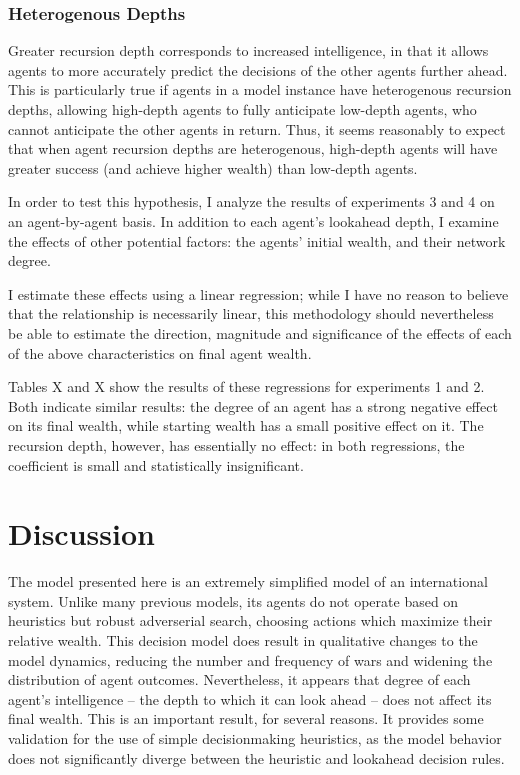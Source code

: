 \documentclass{article}
\begin{document}
\subsubsection{Heterogenous Depths}

Greater recursion depth corresponds to increased intelligence, in that it allows agents to more accurately predict the decisions of the other agents further ahead. This is particularly true if agents in a model instance have heterogenous recursion depths, allowing high-depth agents to fully anticipate low-depth agents, who cannot anticipate the other agents in return. Thus, it seems reasonably to expect that when agent recursion depths are heterogenous, high-depth agents will have greater success (and achieve higher wealth) than low-depth agents. 

In order to test this hypothesis, I analyze the results of experiments 3 and 4 on an agent-by-agent basis. In addition to each agent's lookahead depth, I examine the effects of other potential factors: the agents' initial wealth, and their network degree.

I estimate these effects using a linear regression; while I have no reason to believe that the relationship is necessarily linear, this methodology should nevertheless be able to estimate the direction, magnitude and significance of the effects of each of the above characteristics on final agent wealth. 

Tables X and X show the results of these regressions for experiments 1 and 2. Both indicate similar results: the degree of an agent has a strong negative effect on its final wealth, while starting wealth has a small positive effect on it. The recursion depth, however, has essentially no effect: in both regressions, the coefficient is small and statistically insignificant. 


\section{Discussion}

The model presented here is an extremely simplified model of an international system. Unlike many previous models, its agents do not operate based on heuristics but robust adverserial search, choosing actions which maximize their relative wealth. This decision model does result in qualitative changes to the model dynamics, reducing the number and frequency of wars and widening the distribution of agent outcomes. Nevertheless, it appears that degree of each agent's intelligence -- the depth to which it can look ahead -- does not affect its final wealth. This is an important result, for several reasons. It provides some validation for the use of simple decisionmaking heuristics, as the model behavior does not significantly diverge between the heuristic and lookahead decision rules. 
\end{document}
